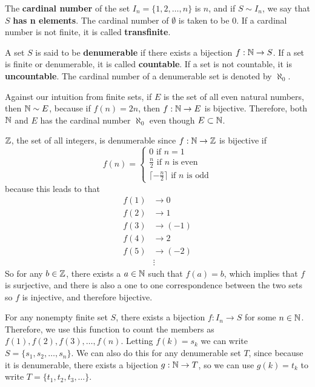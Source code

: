 \begin{definition}
	The \textbf{cardinal number} of the set $I_n=\{1,2,\hdots,n\}$ is $n$, and if $S\sim I_n$, we say that $S$ \textbf{has n elements}. The cardinal number of $\emptyset$ is taken to be $0$. If a cardinal number is not finite, it is called \textbf{transfinite}. 
\end{definition}

\begin{definition}
	A set $S$ is said to be \textbf{denumerable} if there exists a bijection $f:\mathbb{N} \rightarrow S$. If a set is finite or denumerable, it is called \textbf{countable}. If a set is not countable, it is \textbf{uncountable}. The cardinal number of a denumerable set is denoted by $\aleph_0$.
\end{definition}

\begin{remark}
	Against our intuition from finite sets, if $E$ is the set of all even natural numbers, then $\mathbb{N}\sim E$, because if $f(n)=2n$, then $f:\mathbb{N}\rightarrow E$ is bijective. Therefore, both $\mathbb{N}$ and $E$ has the cardinal number $\aleph_0$ even though $E\subset \mathbb{N}$.
\end{remark}

\begin{eg}
	$\mathbb{Z}$, the set of all integers, is denumerable since $f:\mathbb{N} \rightarrow \mathbb{Z}$ is bijective if $$f(n)=\begin{cases}
		0 \text{ if $n=1$}\\
		\frac{n}{2} \text{ if $n$ is even}\\
		\lceil-\frac{n}{2}\rceil \text{ if $n$ is odd}
	\end{cases}$$
	because this leads to that
	\begin{align*}
		f(1) &\rightarrow 0 \\
		f(2) &\rightarrow 1 \\
		f(3) &\rightarrow (-1) \\
		f(4) &\rightarrow 2 \\
		f(5) &\rightarrow (-2) \\
		&\vdots
	\end{align*}
	So for any $b\in \mathbb{Z}$, there exists a $a\in \mathbb{N}$ such that $f(a)=b$, which implies that $f$ is surjective, and there is also a one to one correspondence between the two sets so $f$ is injective, and therefore bijective.
\end{eg}

\begin{notation}
	For any nonempty finite set $S$, there exists a bijection $f:I_n\rightarrow S$ for some $n\in \mathbb{N}$. Therefore, we use this function to count the members as $f(1),f(2),f(3),\hdots,f(n)$. Letting $f(k)=s_k$ we can write $S=\{s_1,s_2,\hdots,s_n\}$. We can also do this for any denumerable set $T$, since because it is denumerable, there exists a bijection $g:\mathbb{N}\rightarrow T$, so we can use $g(k)=t_k$ to write $T=\{t_1,t_2,t_3,\hdots\}$.
\end{notation}

